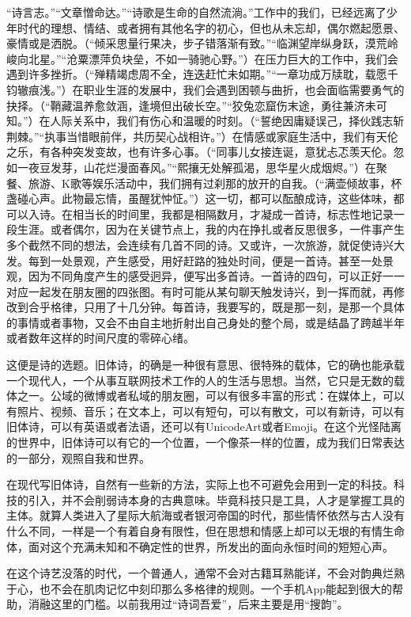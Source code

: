 \documentclass{article}
\begin{document}
“诗言志。”“文章憎命达。”“诗歌是生命的自然流淌。”工作中的我们，已经远离了少年时代的理想、情结、或者拥有其他名字的初心，但也从未忘却，偶尔燃起愿景、豪情或是洒脱。（“倾采思量行果决，步子错落渐有致。”“临渊望岸纵身跃，漠荒岭峻向北星。”“沧粟漂萍负块垒，不如一骑驰心野。”）在压力巨大的工作中，我们会遇到许多挫折。（“殚精竭虑周不全，连迭赶忙未如期。”“一章功成万牍耽，载愿千钧辙痕浅。”）在职业生涯的发展中，我们会遇到困顿与曲折，也会面临需要勇气的抉择。（“鞘藏温养愈敛涵，逢境但出破长空。”“狡兔恋窟伤末途，勇往兼济未可知。”）在人际关系中，我们有伤心和温暖的时刻。（“誓绝因庸疑误己，择伙践志斩荆棘。”“执事当惜眼前伴，共历契心战相许。”）在情感或家庭生活中，我们有天伦之乐，有各种突发变故，也有许多心事。（“同事儿女接连诞，意犹忐忑羡天伦。忽如一夜豆发芽，山花烂漫面春风。”“熙攘无处解孤渴，思华星火成烟烬。”）在聚餐、旅游、K歌等娱乐活动中，我们拥有过刹那的放开的自我。（“满壶倾故事，杯盏碰心声。此物最忘情，虽醒犹忡怔。”）这一切，都可以酝酿成诗，这些体味，都可以入诗。在相当长的时间里，我都是相隔数月，才凝成一首诗，标志性地记录一段生涯。或者偶尔，因为在关键节点上，我的内在挣扎或者反思很多，一件事产生多个截然不同的想法，会连续有几首不同的诗。又或许，一次旅游，就促使诗兴大发。每到一处景观，产生感受，用好赶路的独处时间，便是一首诗。甚至一处景观，因为不同角度产生的感受迥异，便写出多首诗。一首诗的四句，可以正好一一对应一起发在朋友圈的四张图。有时可能从某句聊天触发诗兴，到一挥而就，再修改到合乎格律，只用了十几分钟。每首诗，我要写的，既是那一刻，是那一个具体的事情或者事物，又会不由自主地折射出自己身处的整个局，或是结晶了跨越半年或者数年这样的时间尺度的零碎心绪。

这便是诗的选题。旧体诗，的确是一种很有意思、很特殊的载体，它的确也能承载一个现代人，一个从事互联网技术工作的人的生活与思想。当然，它只是无数的载体之一。公域的微博或者私域的朋友圈，可以有很多丰富的形式：在媒体上，可以有照片、视频、音乐；在文本上，可以有短句，可以有散文，可以有新诗，可以有旧体诗，可以有英语或者法语，还可以有UnicodeArt或者Emoji。在这个光怪陆离的世界中，旧体诗可以有它的一个位置，一个像茶一样的位置，成为我们日常表达的一部分，观照自我和世界。

在现代写旧体诗，自然有一些新的方法，实际上也不可避免会用到一定的科技。科技的引入，并不会削弱诗本身的古典意味。毕竟科技只是工具，人才是掌握工具的主体。就算人类进入了星际大航海或者银河帝国的时代，那些情怀依然与古人没有什么不同，一样是一个有着自身有限性，但在思想和情感上却可以无垠的有情生命体，面对这个充满未知和不确定性的世界，所发出的面向永恒时间的短短心声。

在这个诗艺没落的时代，一个普通人，通常不会对古籍耳熟能详，不会对韵典烂熟于心，也不会在肌肉记忆中刻印那么多格律的规则。一个手机App能起到很大的帮助，消融这里的门槛。以前我用过``诗词吾爱''，后来主要是用``搜韵''。
\end{document}
